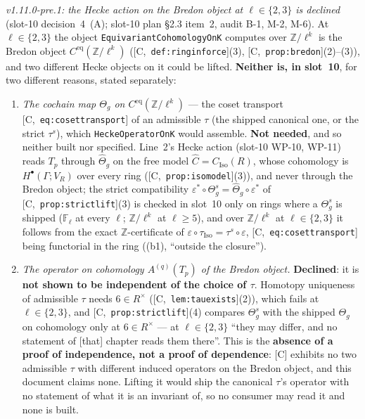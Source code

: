 \documentclass[11pt]{article}
\theoremstyle{remark}
\newcommand{\F}{\mathbb{F}}
\newcommand{\Z}{\mathbb{Z}}
\newcommand{\Ga}{\Gamma}
\newcommand{\Fl}{\F_\ell}
\newcommand{\HA}[1]{[C,~\texttt{#1}]}      %
\begin{document}
\begin{enumerate}[label=(b\arabic*)]
  \begingroup\sloppy\emph{v1.11.0-pre.1: the Hecke action on the Bredon object at $\ell\in\{2,3\}$ is
  declined} (slot-10 decision~4~(A); slot-10 plan \S2.3 item~2, audit B-1, M-2, M-6). At
  $\ell\in\{2,3\}$ the object \texttt{EquivariantCohomologyOnK} computes over $\Z/\ell^k$ is the
  Bredon object $C^{\mathrm{eq}}(\Z/\ell^k)$ (\HA{def:ringinforce}(3), \HA{prop:bredon}(2)--(3)), and
  two different Hecke objects on it could be lifted. \textbf{Neither is, in slot~10}, for two
  different reasons, stated separately:
  \begin{enumerate}[label=(\alph*)]
  \item \emph{The cochain map $\Theta_g$ on $C^{\mathrm{eq}}(\Z/\ell^k)$} --- the coset transport
    \HA{eq:cosettransport} of an admissible $\tau$ (the shipped canonical one, or the strict
    $\tau^{s}$), which \texttt{HeckeOperatorOnK} would assemble. \textbf{Not needed}, and so neither
    built nor specified. Line~2's Hecke action (slot-10 WP-10, WP-11) reads $T_p$ through
    $\widehat\Theta_g$ on the free model $\widehat C=C_{\mathrm{Iso}}(R)$, whose cohomology is
    $H^{\bullet}(\Ga;V_R)$ over every ring (\HA{prop:isomodel}(3)), and never through the Bredon object;
    the strict compatibility $\varepsilon^{\ast}\circ\Theta^{s}_g=\widehat\Theta_g\circ\varepsilon^{\ast}$
    of \HA{prop:strictlift}(3) is checked in slot~10 only on rings where a $\Theta^{s}_g$ is shipped
    ($\Fl$ at every $\ell$; $\Z/\ell^k$ at $\ell\ge5$), and over $\Z/\ell^k$ at $\ell\in\{2,3\}$ it
    follows from the exact $\Z$-certificate of $\varepsilon\circ\tau_{\mathrm{Iso}}=\tau^{s}\circ
    \varepsilon$, \HA{eq:cosettransport} being functorial in the ring ((b1), ``outside the
    closure'').
  \item \emph{The operator on cohomology $A^{(q)}(T_p)$ of the Bredon object.} \textbf{Declined}: it
    is \textbf{not shown to be independent of the choice of $\tau$}. Homotopy uniqueness of
    admissible $\tau$ needs $6\in R^{\times}$ (\HA{lem:tauexists}(2)), which fails at $\ell\in\{2,3\}$,
    and \HA{prop:strictlift}(4) compares $\Theta^{s}_g$ with the shipped $\Theta_g$ on cohomology only
    at $6\in R^{\times}$ --- at $\ell\in\{2,3\}$ ``they may differ, and no statement of [that] chapter
    reads them there''. This is the \textbf{absence of a proof of independence, not a proof of
    dependence}: [C] exhibits no two admissible $\tau$ with different induced operators on the Bredon
    object, and this document claims none. Lifting it would ship the canonical $\tau$'s operator
    with no statement of what it is an invariant of, so no consumer may read it and none is built.

\end{enumerate}
\end{enumerate}
\end{document}
